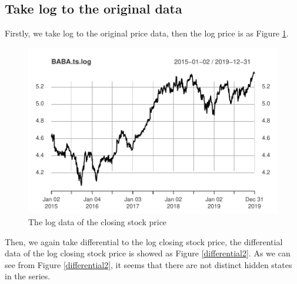 \documentclass{article}
\begin{document}
\subsection{Take log to the original data}
Firstly, we take log to the original price data, then the log price is as Figure \ref{BABA-log}.
\begin{figure}[H]
    \centering
    \includegraphics[width=0.7\linewidth]{images/BABA.log}
    \caption{The log data of the closing stock price}
    \label{BABA-log}
\end{figure}
Then, we again take differential to the log closing stock price, the differential data of the log closing stock price is showed as Figure \ref{differential2}. 
As we can see from Figure \ref{differential2}, it seems that there are not distinct hidden states in the series.
\end{document}
